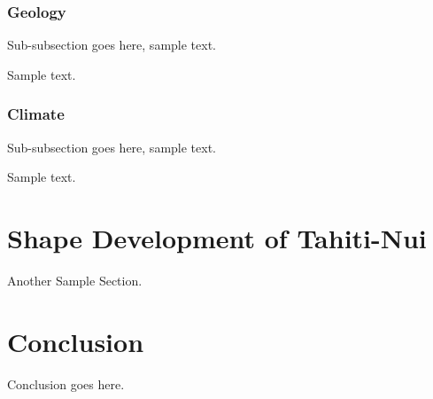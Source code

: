 \documentclass[12pt,journal,onecolumn]{IEEEtran}
\begin{document}
\subsubsection{Geology}

Sub-subsection goes here, sample text.

Sample text.

\subsubsection{Climate}

Sub-subsection goes here, sample text.

Sample text.

\section{Shape Development of Tahiti-Nui}

Another Sample Section.

\section{Conclusion}

Conclusion goes here.

\patchcmd{\section}{\raggedright}{\centering}{}{}
\patchcmd{\section}{\normalsize}{\large\bfseries}{}{}




\end{document}
